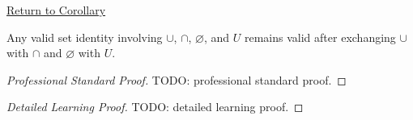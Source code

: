 \newpage
{}
\label{prf:set-duality}

\begin{remark*}[Return]
\hyperref[cor:set-duality]{Return to Corollary}
\end{remark*}

\begin{corollary*}
Any valid set identity involving $\cup$, $\cap$, $\varnothing$, and $U$
remains valid after exchanging $\cup$ with $\cap$ and $\varnothing$ with $U$.
\end{corollary*}

\begin{proof}[Professional Standard Proof]
\LRAProofBodyStart
TODO: professional standard proof.
\end{proof}

\begin{proof}[Detailed Learning Proof]
\LRAProofBodyStart
TODO: detailed learning proof.
\end{proof}

\begin{remark*}
\end{remark*}

\begin{dependencies}
\NoLocalDependencies
\end{dependencies}

\clearpage
